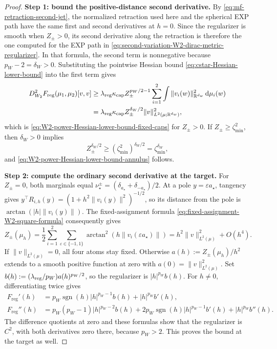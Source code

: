 \begin{proof}
\noindent\textbf{Step 1: bound the positive-distance second derivative.}
By \cref{eq:mf-retraction-second-jet}, the normalized retraction used here
and the spherical EXP path have the same first and second derivatives at
\(h=0\).  Since the regularizer is smooth when \(Z_\pm>0\), its second
derivative along the retraction is therefore the one computed for the EXP
path in \cref{eq:second-variation-W2-dirac-metric-regularizer}.  In that
formula, the second term is nonnegative because
\(p_W-2=\delta_W>0\).  Substituting the pointwise Hessian bound
\cref{eq:cstar-Hessian-lower-bound} into the first term gives
\begin{align*}
 D^2_{W_2}F_{\mathrm{reg}}(\mu_1,\mu_2)[v,v]
 &\ge
 \lambda_{\mathrm{reg}}\kappa_{\mathrm{cap}}Z_\pm^{p_W/2-1}
 \sum_{i=1}^2\int
 \|v_i(w)\|_{\mathbb R^{d_w}}^2\,\dd\mu_i(w)\\
 &=
 \lambda_{\mathrm{reg}}\kappa_{\mathrm{cap}}Z_\pm^{\delta_W/2}
 \|v\|_{L^2(\mu;\mathbb R^{d_w})}^2,
\end{align*}
which is \cref{eq:W2-power-Hessian-lower-bound-fixed-caps} for
\(Z_\pm>0\).  If \(Z_\pm\ge\zeta_{\min}^2\), then \(\delta_W>0\) implies
\[
 Z_\pm^{\delta_W/2}
 \ge (\zeta_{\min}^2)^{\delta_W/2}
 =\zeta_{\min}^{\delta_W},
\]
and \cref{eq:W2-power-Hessian-lower-bound-annulus} follows.

\par\noindent\textbf{Step 2: compute the ordinary second derivative at the target.}
For \(Z_\pm=0\), both marginals equal
\(\nu_\star^\pm=(\delta_{a_\star}+\delta_{-a_\star})/2\).
At a pole \(y=\varepsilon a_\star\), tangency gives
\(y^\top R_{i,h}(y)=(1+h^2\|v_i(y)\|^2)^{-1/2}\), so its distance
from the pole is \(\arctan(|h|\|v_i(y)\|)\). The fixed-assignment
formula \cref{eq:fixed-assignment-W2-square-formula} consequently gives
\begin{equation}
\label{eq:mf-zero-distance-retraction}
 Z_\pm(\mu_h)=\frac12\sum_{i=1}^2\sum_{\varepsilon\in\{-1,1\}}
 \arctan^2(h\|v_i(\varepsilon a_\star)\|)
 =h^2\|v\|_{L^2(\mu)}^2+O(h^4).
\end{equation}
If \(\|v\|_{L^2(\mu)}=0\), all four atoms stay fixed. Otherwise
\(a(h):=Z_\pm(\mu_h)/h^2\) extends to a smooth positive function at
zero with \(a(0)=\|v\|_{L^2(\mu)}^2\). Set
\(b(h):=(\lambda_{\mathrm{reg}}/p_W)a(h)^{p_W/2}\), so the regularizer is
\(|h|^{p_W}b(h)\). For \(h\ne0\), differentiating twice gives
\[
\begin{aligned}
 F_{\mathrm{reg}}'(h)
 &=p_W\operatorname{sgn}(h)|h|^{p_W-1}b(h)+|h|^{p_W}b'(h),\\
 F_{\mathrm{reg}}''(h)
 &=p_W(p_W-1)|h|^{p_W-2}b(h)
 +2p_W\operatorname{sgn}(h)|h|^{p_W-1}b'(h)+|h|^{p_W}b''(h).
\end{aligned}
\]
The difference quotients at zero and these formulas show that the
regularizer is \(C^2\), with both derivatives zero there, because
\(p_W>2\). This proves the bound at the target as well.
\end{proof}

